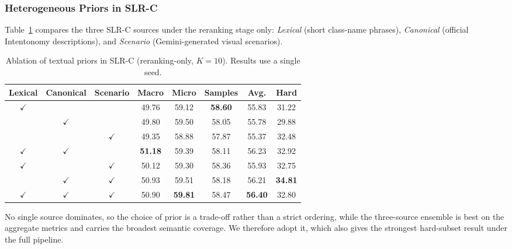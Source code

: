 

\subsubsection{Heterogeneous Priors in SLR-C}

Table~\ref{tab:prior_ablation} compares the three SLR-C sources under the reranking stage only: \textit{Lexical} (short class-name phrases), \textit{Canonical} (official Intentonomy descriptions), and \textit{Scenario} (Gemini-generated visual scenarios).
\begin{table}[htbp]
\centering
\caption{Ablation of textual priors in SLR-C (reranking-only, $K{=}10$). Results use a single seed.}
\label{tab:prior_ablation}
\begin{tabular}{cccccccc}
\hline
Lexical & Canonical & Scenario & Macro & Micro & Samples & Avg. & Hard \\
\hline
$\checkmark$ &  &  & 49.76 & 59.12 & \textbf{58.60} & 55.83 & 31.22 \\
 & $\checkmark$ &  & 49.80 & 59.50 & 58.05 & 55.78 & 29.88 \\
 &  & $\checkmark$ & 49.35 & 58.88 & 57.87 & 55.37 & 32.48 \\
$\checkmark$ & $\checkmark$ &  & \textbf{51.18} & 59.39 & 58.11 & 56.23 & 32.92 \\
$\checkmark$ &  & $\checkmark$ & 50.12 & 59.30 & 58.36 & 55.93 & 32.75 \\
 & $\checkmark$ & $\checkmark$ & 50.93 & 59.51 & 58.18 & 56.21 & \textbf{34.81} \\
$\checkmark$ & $\checkmark$ & $\checkmark$ & 50.90 & \textbf{59.81} & 58.47 & \textbf{56.40} & 32.80 \\
\hline
\end{tabular}
\end{table}

No single source dominates, so the choice of prior is a trade-off rather than a strict ordering, while the three-source ensemble is best on the aggregate metrics and carries the broadest semantic coverage. We therefore adopt it, which also gives the strongest hard-subset result under the full pipeline.

